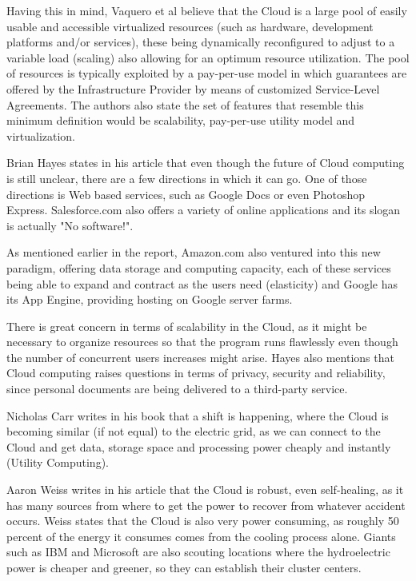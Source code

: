 Having this in mind, Vaquero et al believe that the Cloud is a large pool of easily usable and accessible virtualized resources (such as hardware, development platforms and/or services), these being dynamically reconfigured to adjust to a variable load (scaling) also allowing for an optimum resource utilization. The pool of resources is typically exploited by a pay-per-use model in which guarantees are offered by the Infrastructure Provider by means of customized Service-Level Agreements. The authors also state the set of features that resemble this minimum definition would be scalability, pay-per-use utility model and virtualization. \cite{vaquero}

Brian Hayes states in his article that even though the future of Cloud computing is still unclear, there are a few directions in which it can go. One of those directions is Web based services, such as Google Docs or even Photoshop Express. Salesforce.com also offers a variety of online applications and its slogan is actually "No software!". 

As mentioned earlier in the report, Amazon.com also ventured into this new paradigm, offering data storage and computing capacity, each of these services being able to expand and contract as the users need (elasticity) and Google has its App Engine, providing hosting on Google server farms.

There is great concern in terms of scalability in the Cloud, as it might be necessary to organize resources so that the program runs flawlessly even though the number of concurrent users increases might arise. Hayes also mentions that Cloud computing raises questions in terms of privacy, security and reliability, since personal documents are being delivered to a third-party service.\cite{hayes}

Nicholas Carr writes in his book that a shift is happening, where the Cloud is becoming similar (if not equal) to the electric grid, as we can connect to the Cloud and get data, storage space and processing power cheaply and instantly (Utility Computing). \cite{carr}

Aaron Weiss writes in his article that the Cloud is robust, even self-healing, as it has many sources from where to get the power to recover from whatever accident occurs. Weiss states that the Cloud is also very power consuming, as roughly 50 percent of the energy it consumes comes from the cooling process alone. Giants such as IBM and Microsoft are also scouting locations where the hydroelectric power is cheaper and greener, so they can establish their cluster centers.\cite{aaron-clouds}



